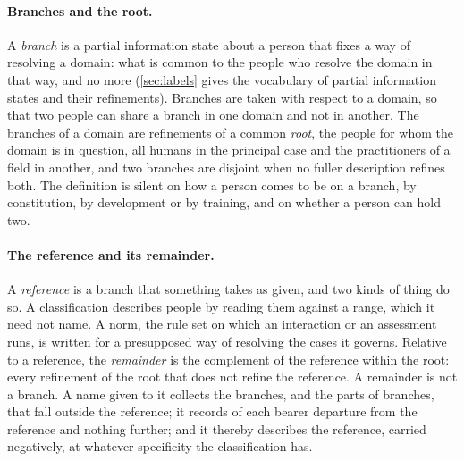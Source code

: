 \paragraph{Branches and the root.} A \emph{branch} is a partial information state about a person that fixes a way of resolving a domain: what is common to the people who resolve the domain in that way, and no more (\autoref{sec:labels} gives the vocabulary of partial information states and their refinements). Branches are taken with respect to a domain, so that two people can share a branch in one domain and not in another. The branches of a domain are refinements of a common \emph{root}, the people for whom the domain is in question, all humans in the principal case and the practitioners of a field in another, and two branches are disjoint when no fuller description refines both. The definition is silent on how a person comes to be on a branch, by constitution, by development or by training, and on whether a person can hold two.

\paragraph{The reference and its remainder.} A \emph{reference} is a branch that something takes as given, and two kinds of thing do so. A classification describes people by reading them against a range, which it need not name. A norm, the rule set on which an interaction or an assessment runs, is written for a presupposed way of resolving the cases it governs. Relative to a reference, the \emph{remainder} is the complement of the reference within the root: every refinement of the root that does not refine the reference. A remainder is not a branch. A name given to it collects the branches, and the parts of branches, that fall outside the reference; it records of each bearer departure from the reference and nothing further; and it thereby describes the reference, carried negatively, at whatever specificity the classification has.


